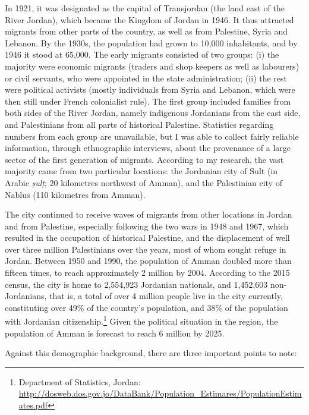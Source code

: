 \documentclass[output=paper]{langsci/langscibook}
\begin{document}
In 1921, it was designated as the capital of Transjordan (the land east of the River Jordan), which became the Kingdom of Jordan in 1946. It thus attracted migrants from other parts of the country, as well as from Palestine, Syria and Lebanon. By the 1930s, the population had grown to 10,000 inhabitants, and by 1946 it stood at 65,000. The early migrants consisted of two groups: (i) the majority were economic migrants (traders and shop keepers as well as labourers) or civil servants, who were appointed in the state administration; (ii) the rest were political activists (mostly individuals from Syria and Lebanon, which were then still under French colonialist rule). The first group included families from both sides of the River Jordan, namely indigenous Jordanians from the east side, and Palestinians from all parts of historical Palestine. Statistics regarding numbers from each group are unavailable, but I was able to collect fairly reliable information, through ethnographic interviews, about the provenance of a large sector of the first generation of migrants. According to my research, the vast majority came from two particular locations: the Jordanian city of Sult (in Arabic \textit{ṣulṭ}; 20 kilometres northwest of Amman), and the Palestinian city of Nablus (110 kilometres from Amman).

The city continued to receive waves of migrants from other locations in Jordan and from Palestine, especially following the two wars in 1948 and 1967, which resulted in the occupation of historical Palestine, and the displacement of well over three million Palestinians over the years, most of whom sought refuge in Jordan. Between 1950 and 1990, the population of Amman doubled more than fifteen times, to reach approximately 2 million by 2004. According to the 2015 census, the city is home to 2,554,923 Jordanian nationals, and 1,452,603 non-Jordanians, that is, a total of over 4 million people live in the city currently, constituting over 49\% of the country’s population, and 38\% of the population with Jordanian citizenship.\footnote{Department of Statistics, Jordan: \url{http://dosweb.dos.gov.jo/DataBank/Population_Estimares/PopulationEstimates.pdf}} Given the political situation in the region, the population of Amman is forecast to reach 6 million by 2025. 

Against this demographic background, there are three important points to note:
\end{document}
